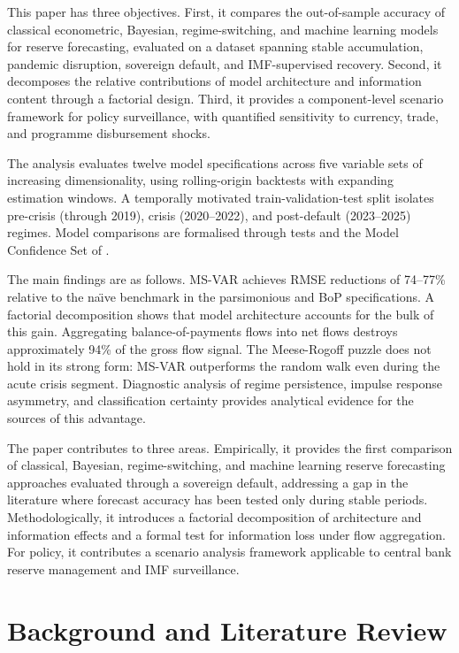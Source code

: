 \documentclass[12pt,a4paper]{article}
\begin{document}
This paper has three objectives. First, it compares the out-of-sample accuracy of classical econometric, Bayesian, regime-switching, and machine learning models for reserve forecasting, evaluated on a dataset spanning stable accumulation, pandemic disruption, sovereign default, and IMF-supervised recovery. Second, it decomposes the relative contributions of model architecture and information content through a factorial design. Third, it provides a component-level scenario framework for policy surveillance, with quantified sensitivity to currency, trade, and programme disbursement shocks.

The analysis evaluates twelve model specifications across five variable sets of increasing dimensionality, using rolling-origin backtests with expanding estimation windows. A temporally motivated train-validation-test split isolates pre-crisis (through 2019), crisis (2020--2022), and post-default (2023--2025) regimes. Model comparisons are formalised through \cite{DieboldMariano1995} tests and the Model Confidence Set of \cite{HansenLundeNason2011}.

The main findings are as follows. MS-VAR achieves RMSE reductions of 74--77\% relative to the na\"{\i}ve benchmark in the parsimonious and BoP specifications. A factorial decomposition shows that model architecture accounts for the bulk of this gain. Aggregating balance-of-payments flows into net flows destroys approximately 94\% of the gross flow signal. The Meese-Rogoff puzzle does not hold in its strong form: MS-VAR outperforms the random walk even during the acute crisis segment. Diagnostic analysis of regime persistence, impulse response asymmetry, and classification certainty provides analytical evidence for the sources of this advantage.

The paper contributes to three areas. Empirically, it provides the first comparison of classical, Bayesian, regime-switching, and machine learning reserve forecasting approaches evaluated through a sovereign default, addressing a gap in the literature where forecast accuracy has been tested only during stable periods. Methodologically, it introduces a factorial decomposition of architecture and information effects and a formal test for information loss under flow aggregation. For policy, it contributes a scenario analysis framework applicable to central bank reserve management and IMF surveillance.

\section{Background and Literature Review}
\end{document}
